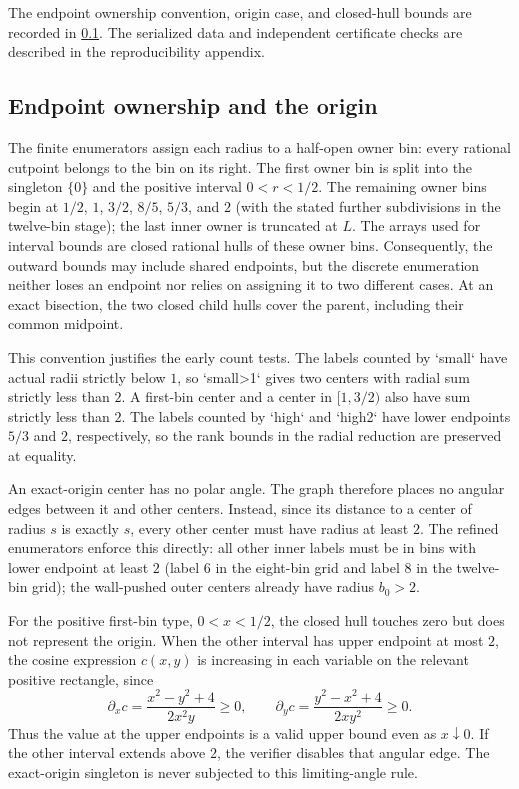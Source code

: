 \documentclass[11pt]{article}
\theoremstyle{definition}
\begin{document}
The endpoint ownership convention, origin case, and closed-hull bounds are recorded in \cref{sec:bins}. The serialized data and independent certificate checks are described in the reproducibility appendix.

\subsection{Endpoint ownership and the origin}\label{sec:bins}

The finite enumerators assign each radius to a half-open owner bin: every rational cutpoint belongs to the bin on its right. The first owner bin is split into the singleton $\{0\}$ and the positive interval $0<r<1/2$. The remaining owner bins begin at $1/2$, $1$, $3/2$, $8/5$, $5/3$, and $2$ (with the stated further subdivisions in the twelve-bin stage); the last inner owner is truncated at $L$. The arrays used for interval bounds are closed rational hulls of these owner bins. Consequently, the outward bounds may include shared endpoints, but the discrete enumeration neither loses an endpoint nor relies on assigning it to two different cases. At an exact bisection, the two closed child hulls cover the parent, including their common midpoint.

This convention justifies the early count tests. The labels counted by `small` have actual radii strictly below $1$, so `small>1` gives two centers with radial sum strictly less than $2$. A first-bin center and a center in $[1,3/2)$ also have sum strictly less than $2$. The labels counted by `high` and `high2` have lower endpoints $5/3$ and $2$, respectively, so the rank bounds in the radial reduction are preserved at equality.

An exact-origin center has no polar angle. The graph therefore places no angular edges between it and other centers. Instead, since its distance to a center of radius $s$ is exactly $s$, every other center must have radius at least $2$. The refined enumerators enforce this directly: all other inner labels must be in bins with lower endpoint at least $2$ (label $6$ in the eight-bin grid and label $8$ in the twelve-bin grid); the wall-pushed outer centers already have radius $b_0>2$.

For the positive first-bin type, $0<x<1/2$, the closed hull touches zero but does not represent the origin. When the other interval has upper endpoint at most $2$, the cosine expression $c(x,y)$ is increasing in each variable on the relevant positive rectangle, since
\[
\partial_x c=\frac{x^2-y^2+4}{2x^2y}\ge0,\qquad
\partial_y c=\frac{y^2-x^2+4}{2xy^2}\ge0.
\]
Thus the value at the upper endpoints is a valid upper bound even as $x\downarrow0$. If the other interval extends above $2$, the verifier disables that angular edge. The exact-origin singleton is never subjected to this limiting-angle rule.
\end{document}
